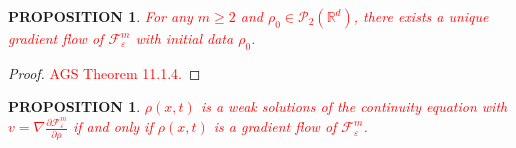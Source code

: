 \documentclass[11pt,leqno]{amsart}
\newtheorem{prop}[thm]{PROPOSITION}
\theoremstyle{definition}
\newcommand{\kcomment}[1]{{\color{Aquamarine}#1}} %
\newcommand{\Rd}{{\mathord{\mathbb R}^d}}
\newcommand{\grad}{\nabla}
\newcommand{\F}{\mathcal{F}}
\def\P{{\mathcal P}}
\def\e{\varepsilon}
\def\F{\mathcal{F}}
\begin{document}
%

\begin{prop}
\textcolor{red}{For any $m\geq 2$ and $\rho_0 \in \P_2(\Rd)$, there exists a unique gradient flow of $\F_\e^m$ with initial data $\rho_0$.}
\end{prop}

\begin{proof}
\textcolor{red}{AGS Theorem 11.1.4.}
\end{proof}

\begin{prop}
\textcolor{red}{$\rho(x,t)$ is a weak solutions of the continuity equation with $v = \grad \frac{\partial \F_\e^m}{\partial \rho}$ if and only if $\rho(x,t)$ is a gradient flow of $\F_\e^m$.}
\end{prop}
\end{document}
